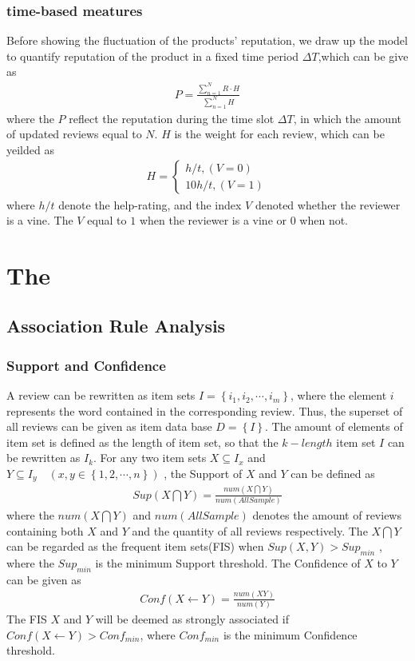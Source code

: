 \documentclass[12pt]{article}%
\begin{document}
\subsubsection{time-based meatures}
Before showing the fluctuation of the products' reputation, we draw up the model to quantify reputation of the product in a fixed time period $\Delta T$,which can be give as
\begin{gather}
P=\frac{\sum_{n=1}^{N}R \cdot H}{\sum_{n=1}^{N} H}
\end{gather}
where the $P$ reflect the reputation during the time slot $\Delta T$, in which the amount of updated reviews equal to $N$. $H$ is the weight for each review, which can be yeilded as 
\begin{gather}
H=\left\{\begin{matrix}h/t ,(V=0)
\\ 10h/t,(V=1)
\end{matrix}\right.
\end{gather}
where $h/t$ denote the help-rating, and the index $V$ denoted whether the reviewer is a vine. The $V$ equal to $1$ when the reviewer is a vine or $0$ when not.
\section{The }
\subsection{Association Rule Analysis}
\subsubsection{Support and Confidence}
A review can be rewritten as item sets $I=\left \{  i_{1},i_{2},\cdots,i_{m}\right \}$, where the element $i$ represents the word contained in the corresponding review. Thus, the superset of all reviews can be given as item data base $D=\left \{ I \right \}$. The amount of elements of item set is defined as the length of item set, so that the $k-length$ item set $I$ can be rewritten as $I_{k}$. For any two item sets $X\subseteq I_{x}$ and $Y\subseteq I_{y}\quad(x,y\in \left \{ 1,2,\cdots,n \right \})$ , the Support of $X$ and $Y$ can be defined as 
\begin{gather}
Sup(X\bigcap Y)=\frac{num(X\bigcap Y)}{num(AllSample)}
\end{gather}
where the $num(X\bigcap Y)$ and $num(AllSample)$ denotes the amount of reviews containing both $X$ and $Y$ and the quantity of all reviews respectively. The $X\bigcap Y$ can be regarded as the frequent item sets(FIS)\cite{bib:4} when $Sup(X,Y)>Sup_{min}$ ,  where the  $Sup_{min}$ is the minimum Support threshold. The Confidence of $X$ to $Y$ can be given as 
\begin{gather}
Conf(X\leftarrow Y)=\frac{num(XY)}{num(Y)}
\end{gather}
 The FIS $X$ and $Y$ will be deemed as strongly associated\cite{bib:4} if $Conf(X\leftarrow Y)>Conf_{min}$, where $Conf_{min}$ is the minimum Confidence threshold.
\end{document}
